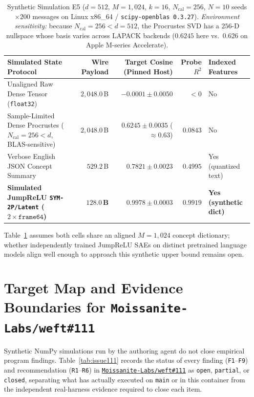 \documentclass[10pt,a4paper]{article}
\begin{document}
\begin{table}[!htbp]
\centering
\caption{Synthetic Simulation E5 ($d=512$, $M=1{,}024$, $k=16$, $N_{\text{cal}}=256$, $N=10$ seeds $\times 200$ messages on Linux x86\_64 / \texttt{scipy-openblas 0.3.27}). \emph{Environment sensitivity:} because $N_{\text{cal}}=256 < d=512$, the Procrustes SVD has a $256$-D nullspace whose basis varies across LAPACK backends ($0.6245$ here vs.\ $0.626$ on Apple M-series Accelerate).}
\label{tab:e5}
\scriptsize
\setlength{\tabcolsep}{4.5pt}
\begin{tabularx}{\linewidth}{@{}>{\raggedright\arraybackslash}X r r r l@{}}
\toprule
\textbf{Simulated State Protocol} & \textbf{Wire Payload} & \textbf{Target Cosine (Pinned Host)} & \textbf{Probe $R^2$} & \textbf{Indexed Features} \\
\midrule
Unaligned Raw Dense Tensor (\texttt{float32}) & $2{,}048.0$\,B & $-0.0001 \pm 0.0050$ & $< 0$ & No \\
Sample-Limited Dense Procrustes ($N_{\text{cal}}=256 < d$, BLAS-sensitive) & $2{,}048.0$\,B & $0.6245 \pm 0.0035$ ($\approx 0.63$) & $0.0843$ & No \\
Verbose English JSON Concept Summary & $529.2$\,B & $0.7821 \pm 0.0023$ & $0.4995$ & Yes (quantized text) \\
\textbf{Simulated JumpReLU \texttt{SYM-2P/Latent} ($2 \times \texttt{frame64}$)} & $\mathbf{128.0}$\,\textbf{B} & $\mathbf{0.9978 \pm 0.0003}$ & $\mathbf{0.9919}$ & \textbf{Yes (synthetic dict)} \\
\bottomrule
\end{tabularx}
\end{table}

Table~\ref{tab:e5} assumes both cells share an aligned $M=1{,}024$ concept dictionary; whether independently trained JumpReLU SAEs on distinct pretrained language models align well enough to approach this synthetic upper bound remains open.

\section{Target Map and Evidence Boundaries for \texttt{Moissanite-Labs/weft\#111}}

Synthetic NumPy simulations run by the authoring agent do not close empirical program findings. Table~\ref{tab:issue111} records the status of every finding (\texttt{F1}--\texttt{F9}) and recommendation (\texttt{R1}--\texttt{R6}) in \href{https://github.com/Moissanite-Labs/weft/issues/111}{\texttt{Moissanite-Labs/weft\#111}} as \texttt{open}, \texttt{partial}, or \texttt{closed}, separating what has actually executed on \texttt{main} or in this container from the independent real-harness evidence required to close each item.
\end{document}
